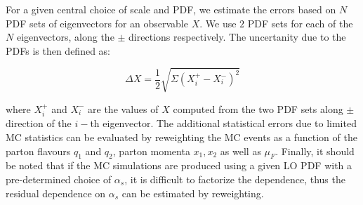 For a given central choice of scale and PDF, we estimate the errors based on $N$ PDF sets of 
eigenvectors for an observable $X$. We use $2$ PDF sets for each of the $N$ eigenvectors, 
along the $\pm$ directions respectively. The uncertanity due to the PDFs is then defined as:

\begin{equation}
	\Delta X = \frac{1}{2} \sqrt{\Sigma (X_i^+ - X_i^-)^2 }
\end{equation}

where $X_i^+$ and $X_i^-$ are the values of $X$ computed from the two PDF sets along $\pm$ direction of the 
$i-$th eigenvector. The additional statistical errors due to limited MC statistics can be evaluated by reweighting
the MC events as a function of the parton flavours $q_1$ and $q_2$, parton momenta $x_1, x_2$ as well as $\mu_F$.
Finally, it should be noted that if the MC simulations are produced using a given LO PDF with a pre-determined 
choice of $\alpha_s$, it is difficult to factorize the dependence, thus the residual dependence on $\alpha_s$ 
can be estimated by reweighting.
